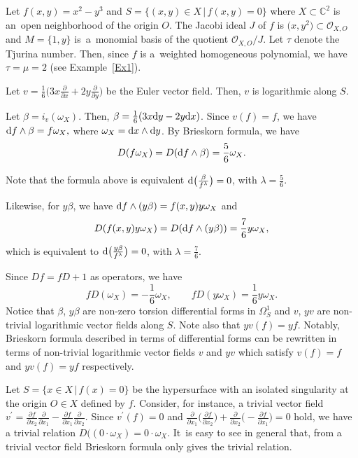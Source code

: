 \documentclass[10pt,a4paper]{amsart}
\numberwithin{equation}{section}
\begin{document}
\begin{Example}
 Let $f(x,y)=x^2-y^3 $ and $ S=\{ (x,y) \in X \,|\, f(x,y)=0 \}$ where $X \subset {\mathbb C}^2$ is an~open neighborhood of the origin $O$. The Jacobi ideal $J$ of $f$ is $\big(x, y^2\big) \subset {\mathcal O}_{X,O}$ and $M=\{1, y\}$ is~a~monomial basis of the quotient
${\mathcal O}_{X,O}/J$. Let $\tau$ denote the Tjurina number. Then, since $f$ is a~weighted homogeneous polynomial, we have $\tau=\mu=2$ (see Example~\ref{Ex1}).

Let $v=\frac{1}{6}\big(3x\frac{\partial}{\partial x}+2y\frac{\partial}{\partial y}\big) $ be the Euler vector field. Then, $v$ is logarithmic along $ S$.

Let $\beta=i_v(\omega_X)$. Then, $ \beta=\frac{1}{6}(3x{\rm d}y-2y{\rm d}x)$.
Since $v(f)=f$, we have $ {\rm d}f\wedge \beta = f\omega_X, $ where $ \omega_X={\rm d}x \wedge {\rm d}y$.
By Brieskorn formula, we have
\begin{gather*}
D(f\omega_X) = D({\rm d}f\wedge \beta) =\dfrac{5}{6}\omega_X.
\end{gather*}

Note that the formula above is equivalent $ {\rm d} \big(\frac{\beta}{f^{\lambda}}\big) =0$, with $\lambda = \frac{5}{6}$.


Likewise, for $ y\beta$, we have $ {\rm d}f\wedge (y\beta) = f(x,y)y\omega_X $ and
\begin{gather*}
D(f(x,y)y\omega_X) = D({\rm d}f\wedge (y\beta)) = \dfrac{7}{6}y\omega_X,
\end{gather*}
which is equivalent to
${\rm d} \big(\frac{y\beta}{f^{\lambda}}\big) =0$, with $\lambda = \frac{7}{6}$.

Since $Df=fD+1$ as operators, we have
\[
fD(\omega_X)=-\dfrac{1}{6}\omega_X, \qquad
fD(y\omega_X)=\dfrac{1}{6}y\omega_X.
\]
Notice that $\beta$, $y\beta$ are non-zero torsion differential forms in $ \Omega_S^{1} $ and $v$, $yv$ are non-trivial logarithmic vector fields along $S$. Note also that $yv(f)=yf$.
Notably, Brieskorn formula described in terms of differential forms can be rewritten in terms of non-trivial logarithmic vector fields $v$ and $yv$ which satisfy $v(f)=f$ and $yv(f)=yf$ respectively.
\end{Example}


Let $S=\{x \in X \,|\, f(x)=0 \}$ be the hypersurface with an isolated singularity at the origin $O \in X$ defined by $f$.
Consider, for instance, a trivial vector field $v^{\prime}=\frac{\partial f}{\partial x_2}\frac{\partial}{\partial x_1}-\frac{\partial f}{\partial x_1}\frac{\partial}{\partial x_2}$. Since $v^{\prime}(f)=0$ and $\frac{\partial}{\partial x_1}\big(\frac{\partial f}{\partial x_2}\big)+\frac{\partial}{\partial x_2}\big({-}\frac{\partial f}{\partial x_1}\big) =0$ hold, we have a trivial relation $ D((0 \cdot \omega_X) = 0 \cdot \omega_X$.
It~is easy to see in general that, from a trivial vector field Brieskorn formula only gives the trivial relation.
\end{document}
